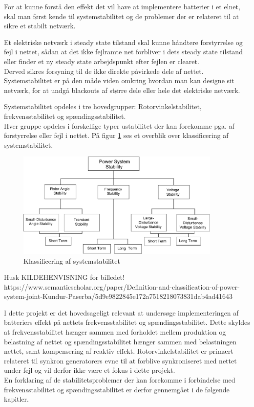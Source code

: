 
\label{Systemstabilitet}
For at kunne forstå den effekt det vil have at implementere batterier i et elnet, skal man først kende til systemstabilitet og de problemer der er relateret til at sikre et stabilt netværk.

Et elektriske netværk i steady state tilstand skal kunne håndtere forstyrrelse og fejl i nettet, sådan at det ikke fejlramte net forbliver i dets steady state tilstand eller finder et ny steady state arbejdspunkt efter fejlen er clearet.\\
Derved sikres forsyning til de ikke direkte påvirkede dele af nettet. Systemstabilitet er på den måde viden omkring hvordan man kan designe sit netværk, for at undgå blackouts af større dele eller hele det elektriske netværk.

Systemstabilitet opdeles i tre hovedgrupper: Rotorvinkelstabilitet, frekvensstabilitet og spændingsstabilitet.\\
Hver gruppe opdeles i forskellige typer ustabilitet der kan forekomme pga. af forstyrrelse eller fejl i nettet. På figur \ref{fig:Overview} ses et overblik over klassificering af systemstabilitet.

\begin{figure}[H] %
	\centering
	\includegraphics[width=0.9\textwidth]{figurer/Classification_of_power_system_stability}
	\caption{Klassificering af systemstabilitet}
	\label{fig:Overview}
\end{figure}

Husk KILDEHENVISNING for billedet!
https://www.semanticscholar.org/paper/Definition-and-classification-of-power-system-joint-Kundur-Paserba/5d9e9822845e172a7518218073831dab4ad41643

I dette projekt er det hovedsageligt relevant at undersøge implementeringen af batteriers effekt på nettets frekvensstabilitet og spændingsstabilitet. Dette skyldes at frekvensstabilitet hænger sammen med forholdet mellem produktion og belastning af nettet og spændingsstabilitet hænger sammen med belastningen nettet, samt kompensering af reaktiv effekt. Rotorvinkelstabilitet er primært relateret til synkron generatorers evne til at forblive synkroniseret med nettet under fejl og vil derfor ikke være et fokus i dette projekt. \\
En forklaring af de stabilitetsproblemer der kan forekomme i forbindelse med frekvensstabilitet og spændingsstabilitet er derfor gennemgået i de følgende kapitler.